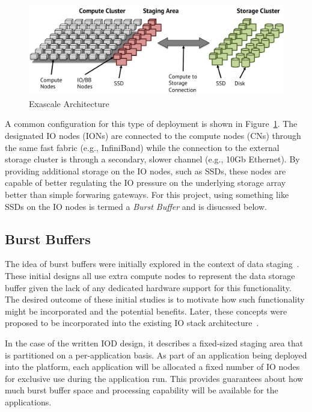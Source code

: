 \documentclass[conference]{IEEEtran}
\begin{document}
\begin{figure}[htbp]
\centering
\vspace{-0.10in}
\includegraphics[width=\columnwidth]{images/exa-arch.png}
\vspace{-0.20in}
\caption{Exascale Architecture}
\label{fig:exa-arch}
\vspace{-0.10in}
\end{figure}

A common configuration for this type of deployment is shown in
Figure~\ref{fig:exa-arch}. The designated IO nodes (IONs) are connected to the
compute nodes (CNs) through the same fast fabric (e.g., InfiniBand) while the
connection to the external storage cluster is through a secondary, slower
channel (e.g., 10Gb Ethernet). By providing additional storage on the IO nodes,
such as SSDs, these nodes are capable of better regulating the IO pressure on
the underlying storage array better than simple forwaring gateways. For this
project, using something like SSDs on the IO nodes is termed a {\em Burst
Buffer} and is disucssed below.

\subsection{Burst Buffers}
\label{sec:burst}

The idea of burst buffers were initially explored in the context of data
staging~\cite{abbasi:2007:datatap,Abbasi:2009:datatap,nisar:2008:staging,zheng:2010:predata}.
These initial designs all use extra compute nodes to represent the data storage
buffer given the lack of any dedicated hardware support for this functionality.
The desired outcome of these initial studies is to motivate how such
functionality might be incorporated and the potential benefits.  Later, these
concepts were proposed to be incorporated into the existing IO stack
architecture~\cite{nowoczynski:2008:zest,bent:2012:challenges,bent:2012:burst-buffer}.

In the case of the written IOD design, it describes a fixed-sized staging area
that is partitioned on a per-application basis. As part of an application
being deployed into the platform, each application will be allocated a fixed
number of IO nodes for exclusive use during the application run. This provides
guarantees about how much burst buffer space and processing capability will be
available for the applications.
\end{document}
